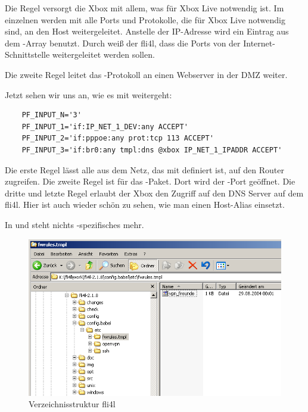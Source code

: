 Die Regel  versorgt die Xbox mit allem, was für
Xbox Live notwendig ist. Im einzelnen werden mit  alle Ports
und Protokolle, die für Xbox Live notwendig sind, an den Host 
weitergeleitet. Anstelle der IP-Adresse wird ein Eintrag aus dem
-Array benutzt. Durch  weiß der fli4l,
dass die Ports von der Internet-Schnittstelle weitergeleitet werden sollen.

Die zweite Regel leitet das -Protokoll an einen Webserver in
der DMZ weiter.

Jetzt sehen wir uns an, wie es mit  weitergeht:

\begin{example}
\begin{verbatim}
    PF_INPUT_N='3'
    PF_INPUT_1='if:IP_NET_1_DEV:any ACCEPT'
    PF_INPUT_2='if:pppoe:any prot:tcp 113 ACCEPT'
    PF_INPUT_3='if:br0:any tmpl:dns @xbox IP_NET_1_IPADDR ACCEPT'
\end{verbatim}
\end{example}

Die erste Regel lässt alle aus dem Netz, das mit  definiert
ist, auf den Router zugreifen. Die zweite Regel ist für das
-Paket. Dort wird der -Port geöffnet. Die
dritte und letzte Regel erlaubt der Xbox den Zugriff auf den DNS Server auf dem
fli4l. Hier ist auch wieder schön zu sehen, wie man einen Host-Alias einsetzt.

In  und  steht nichts
-spezifisches mehr.

\begin{figure}[htbp]
  \centering
  \includegraphics[width=0.9\columnwidth]{etc_fwrules_tmpl_dir}
  \caption{Verzeichnisstruktur fli4l}
  \label{fig:etc_fwrules_tmpl_dir}
\end{figure}

